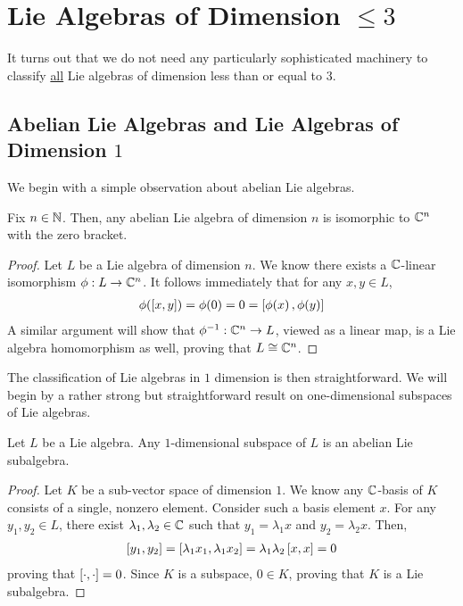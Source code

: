 \section{Lie Algebras of Dimension $\leq 3$}

It turns out that we do not need any particularly sophisticated machinery to classify \underline{all} Lie algebras of dimension less than or equal to $3$.

\subsection{Abelian Lie Algebras and Lie Algebras of Dimension $1$}

We begin with a simple observation about abelian Lie algebras.

\begin{boxproposition}\label{Ch1:Prop:Abelian_Lie_Algebras_Iso}
    Fix $n \in \mathbb{N}$. Then, any abelian Lie algebra of dimension $n$ is isomorphic to $\mathbb{C}^n$ with the zero bracket.
\end{boxproposition}
\begin{proof}
    Let $L$ be a Lie algebra of dimension $n$. We know there exists a $\mathbb{C}$-linear isomorphism $\phi : L \to \mathbb{C}^n$. It follows immediately that for any $x, y \in L$,
    \begin{align*}
        \phi\!\left( \left[ x, y \right] \right) = \phi\!\left( 0 \right) = 0 = \left[ \phi\!\left( x \right), \phi\!\left( y \right) \right]
    \end{align*}
    A similar argument will show that $\phi^{-1} : \mathbb{C}^n \to L$, viewed as a linear map, is a Lie algebra homomorphism as well, proving that $L \cong \mathbb{C}^n$.
\end{proof}

The classification of Lie algebras in $1$ dimension is then straightforward. We will begin by a rather strong but straightforward result on one-dimensional subspaces of Lie algebras.

\begin{proposition}\label{Ch1:Prop:1D_Lie_Subalgebras}
    Let $L$ be a Lie algebra. Any $1$-dimensional subspace of $L$ is an abelian Lie subalgebra.
\end{proposition}
\begin{proof}
    Let $K$ be a sub-vector space of dimension $1$. We know any $\mathbb{C}$-basis of $K$ consists of a single, nonzero element. Consider such a basis element $x$. For any $y_1, y_2 \in L$, there exist $\lambda_1, \lambda_2 \in \mathbb{C}$ such that $y_1 = \lambda_1 x$ and $y_2 = \lambda_2 x$. Then,
    \begin{align*}
        \left[ y_1, y_2 \right] = \left[ \lambda_1 x_1, \lambda_1 x_2 \right] = \lambda_1 \lambda_2 \left[ x, x \right] = 0
    \end{align*}
    proving that $\left[ \cdot, \cdot \right] = 0$. Since $K$ is a subspace, $0 \in K$, proving that $K$ is a Lie subalgebra.
\end{proof}

